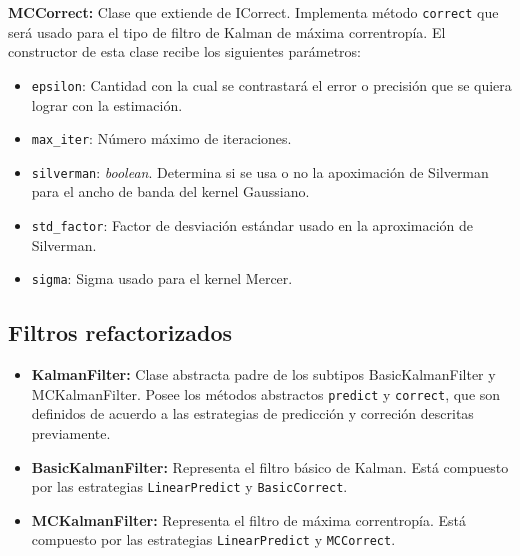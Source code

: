 \textbf{MCCorrect:} Clase que extiende de ICorrect. Implementa m\'etodo \texttt{correct} que ser\'a usado para el tipo de filtro de Kalman de m\'axima correntrop\'ia. El constructor de esta clase recibe los siguientes par\'ametros:

\begin{itemize}
\item \texttt{epsilon}: Cantidad con la cual se contrastar\'a el error o precisi\'on que se quiera lograr con la estimaci\'on.
\item \texttt{max\_iter}: N\'umero m\'aximo de iteraciones.
\item \texttt{silverman}: \textit{boolean}. Determina si se usa o no la apoximaci\'on de Silverman para el ancho de banda del kernel Gaussiano.
\item \texttt{std\_factor}: Factor de desviaci\'on est\'andar usado en la aproximaci\'on de Silverman.
\item \texttt{sigma}: Sigma usado para el kernel Mercer.
\end{itemize}

\subsection{Filtros refactorizados}

\begin{itemize}
\item \textbf{KalmanFilter:} Clase abstracta padre de los subtipos BasicKalmanFilter y MCKalmanFilter. Posee los m\'etodos abstractos \texttt{predict} y \texttt{correct}, que son definidos de acuerdo a las estrategias de predicci\'on y correci\'on descritas previamente.
\item \textbf{BasicKalmanFilter:} Representa el filtro b\'asico de Kalman. Est\'a compuesto por las estrategias \texttt{LinearPredict} y \texttt{BasicCorrect}.
\item \textbf{MCKalmanFilter:} Representa el filtro de m\'axima correntrop\'ia. Est\'a compuesto por las estrategias \texttt{LinearPredict} y \texttt{MCCorrect}.
\end{itemize}
\bigskip

